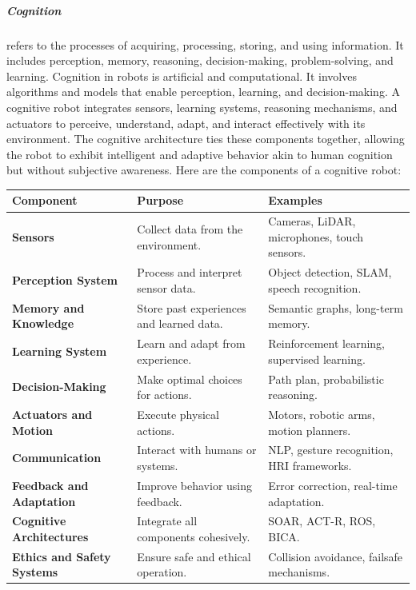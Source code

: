 \documentclass{book}
\begin{document}
\subparagraph{Cognition}
refers to the processes of acquiring, processing, storing, and using information. It includes perception, memory, reasoning, decision-making, problem-solving, and learning. Cognition in robots is artificial and computational. It involves algorithms and models that enable perception, learning, and decision-making. A cognitive robot integrates sensors, learning systems, reasoning mechanisms, and actuators to perceive, understand, adapt, and interact effectively with its environment. The cognitive architecture ties these components together, allowing the robot to exhibit intelligent and adaptive behavior akin to human cognition but without subjective awareness. Here are the components of a cognitive robot:
    \begin{tabular}{|l|l|l|}
        \hline
        \textbf{Component} & \textbf{Purpose} & \textbf{Examples} \\ \hline
        \textbf{Sensors} & Collect data from the environment. & Cameras, LiDAR, microphones, touch sensors. \\ \hline
        \textbf{Perception System} & Process and interpret sensor data. & Object detection, SLAM, speech recognition. \\ \hline
        \textbf{Memory and Knowledge} & Store past experiences and learned data. & Semantic graphs, long-term memory. \\ \hline
        \textbf{Learning System} & Learn and adapt from experience. & Reinforcement learning, supervised learning. \\ \hline
        \textbf{Decision-Making} & Make optimal choices for actions. & Path plan, probabilistic reasoning. \\ \hline
        \textbf{Actuators and Motion} & Execute physical actions. & Motors, robotic arms, motion planners. \\ \hline
        \textbf{Communication} & Interact with humans or systems. & NLP, gesture recognition, HRI frameworks. \\ \hline
        \textbf{Feedback and Adaptation} & Improve behavior using feedback. & Error correction, real-time adaptation. \\ \hline
        \textbf{Cognitive Architectures} & Integrate all components cohesively. & SOAR, ACT-R, ROS, BICA. \\ \hline
        \textbf{Ethics and Safety Systems} & Ensure safe and ethical operation. & Collision avoidance, failsafe mechanisms. \\ \hline
    \end{tabular}
\end{document}
